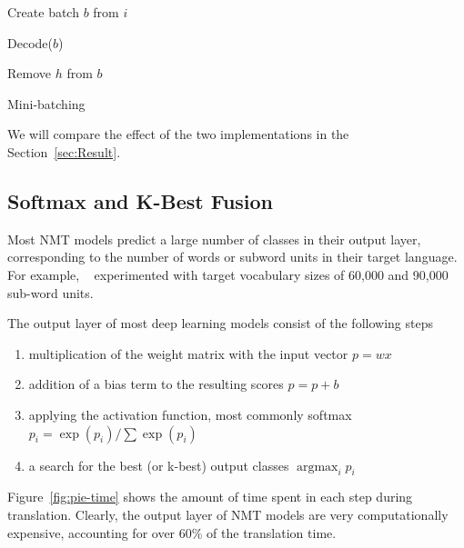 \documentclass[11pt,a4paper]{article}
\DeclareMathOperator*{\argmax}{argmax}
\begin{document}
\begin{algorithm}
\begin{algorithmic}

\State Create batch $b$ from $i$

  \State Decode($b$)
  
      \State Remove $h$ from $b$
    \EndIf
  \EndFor
\EndWhile

\EndProcedure

\end{algorithmic}
\caption{Mini-batching}
\label{algo:Mini-batching}
\end{algorithm}

We will compare the effect of the two implementations in the Section~\ref{sec:Result}.

\subsection{Softmax and K-Best Fusion}

Most NMT models predict a large number of classes in their output layer, corresponding to the number of words or subword units in their target language. For example, ~\citet{sennrich-haddow-birch:2016:P16-12} experimented with target vocabulary sizes of 60,000 and 90,000 sub-word units.

The output layer of most deep learning models consist of the following steps
\begin{enumerate}
   \item \vspace{-2 mm} multiplication of the weight matrix with the input vector $p = w x$
   \item \vspace{-2 mm} addition of a bias term to the resulting scores $p = p + b$
   \item \vspace{-2 mm} applying the activation function, most commonly softmax $ p_i = \exp(p_i) / \sum \exp(p_i) $
   \item \vspace{-2 mm} a search for the best (or k-best) output classes $\argmax_i p_i$
\end{enumerate}

Figure~\ref{fig:pie-time} shows the amount of time spent in each step during translation. Clearly, the output layer of NMT models are very computationally expensive, accounting for over 60\% of the translation time.
\end{document}
